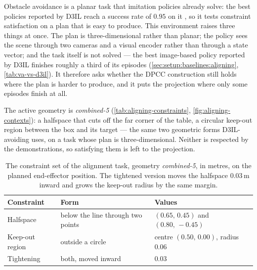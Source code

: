 Obstacle avoidance is a planar task that imitation policies already solve: the best policies reported
by D3IL reach a success rate of $0.95$ on it \parencite[Table~3]{jia2024towards}, so it tests constraint
satisfaction on a plan that is easy to produce. This environment raises three things at once. The plan is
three-dimensional rather than planar; the policy sees the scene through two cameras and a visual encoder
rather than through a state vector; and the task itself is not solved --- the best image-based policy
reported by D3IL finishes roughly a third of its episodes (\autoref{sec:setup:baselines:aligning},
\autoref{tab:va-vs-d3il}). It therefore asks whether the \ac{DPCC} construction still holds where the plan
is harder to produce, and it puts the projection where only some episodes finish at all.

The active geometry is \emph{combined-5} (\autoref{tab:aligning-constraints},
\autoref{fig:aligning-contexts}): a halfspace that cuts off the far corner of the table, a circular
keep-out region between the box and its target --- the same two geometric forms D3IL-avoiding uses, on a
task whose plan is three-dimensional. Neither is respected by the demonstrations, so satisfying them is
left to the projection.

\begin{table}[htpb]
  \caption[Constraint set of the alignment task]{The constraint set of the alignment task, geometry
  \emph{combined-5}, in metres, on the planned end-effector position. The tightened version moves the
  halfspace $0.03$\,m inward and grows the keep-out radius by the same margin.}
  \label{tab:aligning-constraints}
  \centering
  \small
  \setlength{\tabcolsep}{8pt}
  \renewcommand{\arraystretch}{1.2}
  \begin{tabularx}{\linewidth}{@{}l>{\raggedright\arraybackslash}p{3.9cm} X@{}}
    \toprule
    Constraint & Form & Values \\
    \midrule
    Halfspace & below the line through two points & $(0.65,\,0.45)$ and $(0.80,\,-0.45)$ \\
    Keep-out region & outside a circle & centre $(0.50,\,0.00)$, radius $0.06$ \\
    Tightening & both, moved inward & $0.03$ \\
    \bottomrule
  \end{tabularx}
\end{table}

